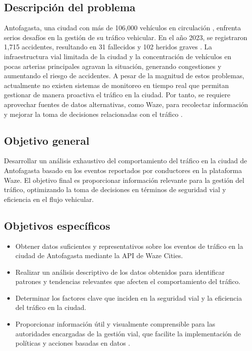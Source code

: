 \documentclass[12pt]{article}
\begin{document}
\subsection{Descripción del problema}

Antofagasta, una ciudad con más de 106,000 vehículos en circulación \parencite{comision2023}, enfrenta serios desafíos en la gestión de su tráfico vehicular. En el año 2023, se registraron 1,715 accidentes, resultando en 31 fallecidos y 102 heridos graves \parencite{comision2023}. La infraestructura vial limitada de la ciudad y la concentración de vehículos en pocas arterias principales agravan la situación, generando congestiones y aumentando el riesgo de accidentes. A pesar de la magnitud de estos problemas, actualmente no existen sistemas de monitoreo en tiempo real que permitan gestionar de manera proactiva el tráfico en la ciudad. Por tanto, se requiere aprovechar fuentes de datos alternativas, como Waze, para recolectar información y mejorar la toma de decisiones relacionadas con el tráfico \parencite{chen2015}.

\subsection{Objetivo general}

Desarrollar un análisis exhaustivo del comportamiento del tráfico en la ciudad de Antofagasta basado en los eventos reportados por conductores en la plataforma Waze. El objetivo final es proporcionar información relevante para la gestión del tráfico, optimizando la toma de decisiones en términos de seguridad vial y eficiencia en el flujo vehicular.

\subsection{Objetivos específicos}

\begin{itemize}
    \item Obtener datos suficientes y representativos sobre los eventos de tráfico en la ciudad de Antofagasta mediante la API de Waze Cities.
    \item Realizar un análisis descriptivo de los datos obtenidos para identificar patrones y tendencias relevantes que afecten el comportamiento del tráfico.
    \item Determinar los factores clave que inciden en la seguridad vial y la eficiencia del tráfico en la ciudad.
    \item Proporcionar información útil y visualmente comprensible para las autoridades encargadas de la gestión vial, que facilite la implementación de políticas y acciones basadas en datos \parencite{auld2009}.
\end{itemize}
\end{document}
